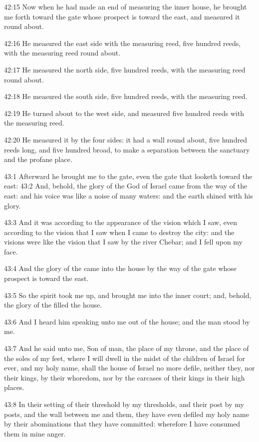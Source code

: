42:15 Now when he had made an end of measuring the inner house, he brought me forth toward the gate whose prospect is toward the east, and measured it round about.

42:16 He measured the east side with the measuring reed, five hundred reeds, with the measuring reed round about.

42:17 He measured the north side, five hundred reeds, with the measuring reed round about.

42:18 He measured the south side, five hundred reeds, with the measuring reed.

42:19 He turned about to the west side, and measured five hundred reeds with the measuring reed.

42:20 He measured it by the four sides: it had a wall round about, five hundred reeds long, and five hundred broad, to make a separation between the sanctuary and the profane place.

43:1 Afterward he brought me to the gate, even the gate that looketh toward the east: 43:2 And, behold, the glory of the God of Israel came from the way of the east: and his voice was like a noise of many waters: and the earth shined with his glory.

43:3 And it was according to the appearance of the vision which I saw, even according to the vision that I saw when I came to destroy the city: and the visions were like the vision that I saw by the river Chebar; and I fell upon my face.

43:4 And the glory of the \LORD came into the house by the way of the gate whose prospect is toward the east.

43:5 So the spirit took me up, and brought me into the inner court; and, behold, the glory of the \LORD filled the house.

43:6 And I heard him speaking unto me out of the house; and the man stood by me.

43:7 And he said unto me, Son of man, the place of my throne, and the place of the soles of my feet, where I will dwell in the midst of the children of Israel for ever, and my holy name, shall the house of Israel no more defile, neither they, nor their kings, by their whoredom, nor by the carcases of their kings in their high places.

43:8 In their setting of their threshold by my thresholds, and their post by my posts, and the wall between me and them, they have even defiled my holy name by their abominations that they have committed: wherefore I have consumed them in mine anger.

